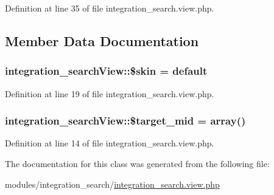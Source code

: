 Definition at line 35 of file integration\+\_\+search.\+view.\+php.



\subsection{Member Data Documentation}
\hypertarget{classintegration__searchView_a4281fc0752039ec4025ddaca5771f074}{}
\subsubsection[{\$skin}]{\setlength{\rightskip}{0pt plus 5cm}integration\+\_\+search\+View\+::\$skin = \textquotesingle{}default\textquotesingle{}}\label{classintegration__searchView_a4281fc0752039ec4025ddaca5771f074}


Definition at line 19 of file integration\+\_\+search.\+view.\+php.

\hypertarget{classintegration__searchView_a17efafd7259acddb90e2c181bcfeaa38}{}
\subsubsection[{\$target\+\_\+mid}]{\setlength{\rightskip}{0pt plus 5cm}integration\+\_\+search\+View\+::\$target\+\_\+mid = array()}\label{classintegration__searchView_a17efafd7259acddb90e2c181bcfeaa38}


Definition at line 14 of file integration\+\_\+search.\+view.\+php.



The documentation for this class was generated from the following file\+:\begin{DoxyCompactItemize}
\item 
modules/integration\+\_\+search/\hyperlink{integration__search_8view_8php}{integration\+\_\+search.\+view.\+php}\end{DoxyCompactItemize}
